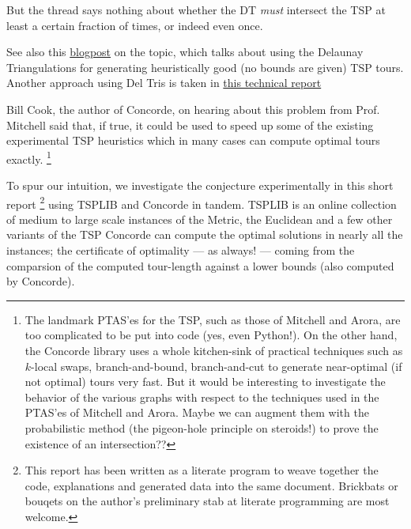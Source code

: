 \begin{description}
     But the thread says nothing about whether the DT \textit{must} intersect the TSP at least a certain fraction of times, or indeed even once.  

     See also this \href{https://web.colby.edu/thegeometricviewpoint/2015/03/09/delauney-triangulations-and-the-traveling-salesman/}{blogpost} on the topic, which 
     talks about using the Delaunay Triangulations for generating heuristically good (no bounds are given) TSP tours. Another approach using Del Tris
     is taken in \href{https://www.researchgate.net/publication/215753374_An_On_log_n_Heuristic_for_the_Euclidean_Traveling_Salesman_Problem}{this technical report} 

     Bill Cook, the author of Concorde\cite{applegate2009certification},  on hearing about this problem from Prof. Mitchell said that, if true, it could be used 
     to speed up some of the existing experimental TSP heuristics which in many cases can compute optimal tours exactly. 
     \footnote{The landmark PTAS'es for the TSP, such as those of Mitchell \cite{mitchell1999guillotine} and Arora\cite{arora1996polynomial},  are too complicated to be put into code (yes, even Python!). On the other hand, the Concorde library uses a whole kitchen-sink of practical techniques such as $k$-local swaps, branch-and-bound, branch-and-cut to generate  near-optimal (if not optimal) tours very fast. But it would be interesting to investigate the behavior of the various graphs with respect to the techniques used in the PTAS'es of Mitchell and Arora. Maybe we can augment them with the probabilistic method (the pigeon-hole principle on steroids!) to prove the existence of an intersection??}

     To spur our intuition,  we investigate the conjecture experimentally in this short report 
     \footnote{This report has been written as a literate program \cite{knuth1984literate,ramsey2008noweb} to weave together the code, explanations and generated data into the same document. Brickbats or bouqets on the author's preliminary stab at literate programming are most welcome.}
     using TSPLIB and Concorde in tandem. TSPLIB \cite{reinelt1991tsplib} is an online collection of medium to large scale instances of the Metric, the Euclidean and a few other variants of the TSP 
     Concorde can compute the optimal solutions in nearly all the instances; the certificate of optimality --- as always! --- coming from the comparsion of the computed tour-length against 
     a lower bounds (also computed by Concorde).


\end{description}
